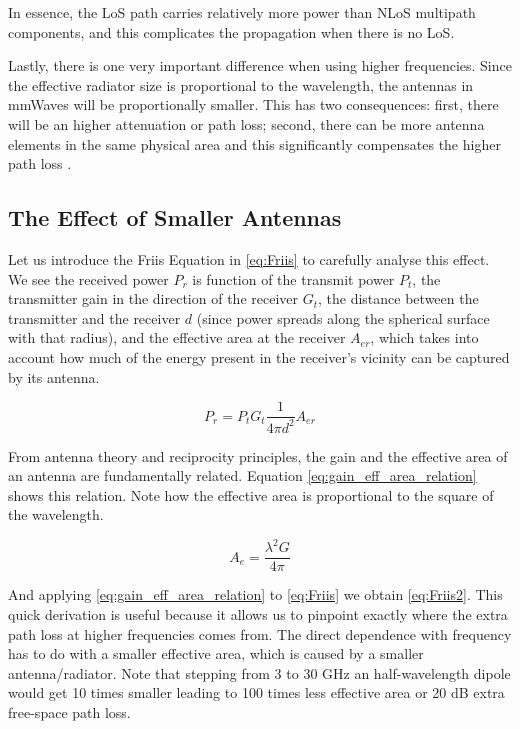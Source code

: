 

In essence, the \ac{LoS} path carries relatively more power than \ac{NLoS} multipath components, and this complicates the propagation when there is no \ac{LoS}.

Lastly, there is one very important difference when using higher frequencies. Since the effective radiator size is proportional to the wavelength, the antennas in mmWaves will be proportionally smaller. This has two consequences: first, there will be an higher attenuation or path loss; second, there can be more antenna elements in the same physical area and this significantly compensates the higher path loss \cite{it_will_work}.



\subsection*{The Effect of Smaller Antennas}

Let us introduce the Friis Equation \cite{Rappaport_wireless_coms} in \eqref{eq:Friis} to carefully analyse this effect. We see the received power $P_r$ is function of the transmit power $P_t$, the transmitter gain in the direction of the receiver $G_t$, the distance between the transmitter and the receiver $d$ (since power spreads along the spherical surface with that radius), and the effective area at the receiver $A_{er}$, which takes into account how much of the energy present in the receiver's vicinity can be captured by its antenna.

\begin{equation} \label{eq:Friis}
    P_r = P_t G_t \frac{1}{4\pi d^2} A_{er}
\end{equation}

From antenna theory and reciprocity principles, the gain and the effective area of an antenna are fundamentally related. Equation \eqref{eq:gain_eff_area_relation} shows this relation. Note how the effective area is proportional to the square of the wavelength. 

\begin{equation} \label{eq:gain_eff_area_relation}
    A_e = \frac{\lambda^2 G}{4 \pi}
\end{equation}

And applying \eqref{eq:gain_eff_area_relation} to \eqref{eq:Friis} we obtain \eqref{eq:Friis2}. This quick derivation is useful because it allows us to pinpoint exactly where the extra path loss at higher frequencies comes from. The direct dependence with frequency has to do with a smaller effective area, which is caused by a smaller antenna/radiator. Note that stepping from 3 to 30 GHz an half-wavelength dipole would get 10 times smaller leading to 100 times less effective area or 20 dB extra free-space path loss.

